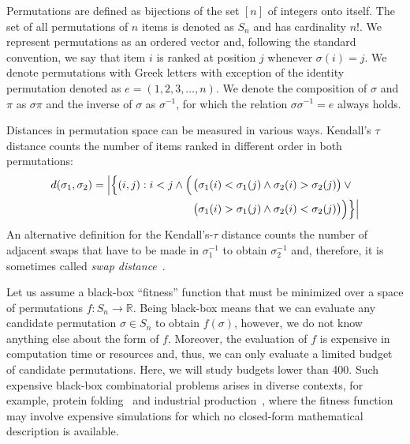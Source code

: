 \documentclass[runningheads]{llncs}
\begin{document}
Permutations are defined as bijections of the set $[n]$ of integers onto itself. The set of all permutations of $n$ items is denoted as $S_n$ and has cardinality $n!$. We represent permutations as an ordered vector and, following the standard convention, we say that item $i$ is ranked at position $j$ whenever $\sigma(i)=j$. We denote permutations with Greek letters with exception of the identity permutation denoted as $e=(1, 2, 3, \dotsc,n)$. We denote the composition of $\sigma$ and $\pi$ as $\sigma\pi$ and the inverse of $\sigma$ as $\sigma^{-1}$, for which the relation $\sigma\sigma^{-1}=e$ always holds.


Distances in permutation space can be measured in various ways.  Kendall's $\tau$ distance counts the number of items ranked in different order in both permutations:
%
\begin{equation}
\begin{split}
d(\sigma _{1},\sigma_{2})=\left\lvert\Bigl\{(i,j):i<j \land \phantom{}\Bigl(\right.&\bigl(\sigma_{1}(i) < \sigma_{1}(j)\land \sigma_{2}(i)>\sigma_{2}(j)\bigr)\lor \phantom{} \\
 &\bigl(\sigma_{1}(i)>\sigma_{1}(j)\land \sigma_{2}(i)<\sigma_{2}(j)\bigr)\Bigr)\Bigr\}\Bigr\rvert\\
 \end{split}
 \label{eq:kendall_decomp}
\end{equation}
%
An alternative definition for the Kendall's-$\tau$ distance counts the number of adjacent swaps that have to be made in $\sigma_1^{-1}$ to obtain $\sigma_2^{-1}$ and, therefore, it is sometimes called \emph{swap distance}~\citep{ZaeStoBar2014:ppsn}.

Let us assume a black-box ``fitness'' function that must be minimized over a
space of permutations $f\colon S_n \to \mathbb{R}$. Being black-box means that
we can evaluate any candidate permutation $\sigma \in S_n$ to obtain
$f(\sigma)$, however, we do not know anything else about the form of
$f$. Moreover, the evaluation of $f$ is expensive in computation time or
resources and, thus, we can only evaluate a limited budget of candidate
permutations. Here, we will study budgets lower than 400. Such expensive
black-box combinatorial problems arises in diverse contexts, for example,
protein folding~\citep{RomKraArn2012protein} and industrial
production~\citep{FerAlvDiaIglEna2014ants}, where the fitness function may
involve expensive simulations for which no closed-form mathematical description
is available.
\end{document}
